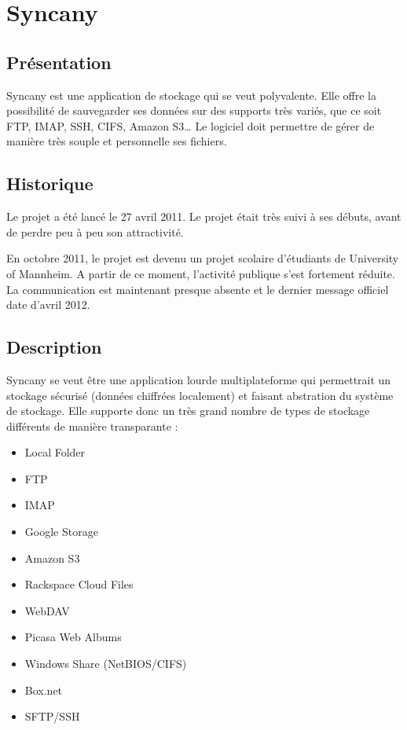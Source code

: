 \chapter{Syncany}
\thispagestyle{EIP} %
\section{Présentation}
Syncany est une application de stockage qui se veut polyvalente. Elle offre la possibilité de sauvegarder ses données sur des supports très variés, que ce soit FTP, IMAP, SSH, CIFS, Amazon S3… Le logiciel doit permettre de gérer de manière très souple et personnelle ses fichiers.

\section{Historique}
Le projet a été lancé le 27 avril 2011. Le projet était très suivi à ses débuts, avant de perdre peu à peu son attractivité. 

En octobre 2011, le projet est devenu un projet scolaire d'étudiants de University of Mannheim. A partir de ce moment, l'activité publique s'est fortement réduite. La communication est maintenant presque absente et le dernier message officiel date d'avril 2012.

\section{Description}
Syncany se veut être une application lourde multiplateforme qui permettrait un stockage sécurisé (données chiffrées localement) et faisant abstration du système de stockage. Elle supporte donc un très grand nombre de types de stockage différents de manière transparante :

\begin{itemize}
\renewcommand{\labelitemi}{$\bullet$}
\item Local Folder
\item FTP
\item IMAP
\item Google Storage
\item Amazon S3
\item Rackspace Cloud Files
\item WebDAV
\item Picasa Web Albums
\item Windows Share (NetBIOS/CIFS)
\item Box.net
\item SFTP/SSH
\end{itemize} \\

